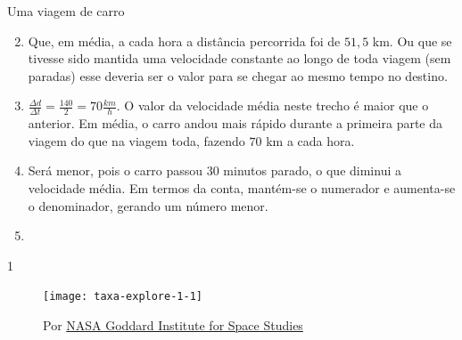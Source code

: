 \begin{answer}{Uma viagem de carro}
{
\begin{enumerate}\setcounter{enumi}{1}
\item Que, em média, a cada hora a distância percorrida foi de $51{,}5$ km. Ou que se tivesse sido mantida uma velocidade constante ao longo de toda viagem (sem paradas) esse deveria ser o valor para se chegar ao mesmo tempo no destino.

\item $\displaystyle\frac{\Delta d}{\Delta t}= \frac{140}{2}=70\frac{km}{h}$. O valor da velocidade média neste trecho é maior que o anterior. Em média, o carro andou mais rápido durante a primeira parte da viagem do que na viagem toda, fazendo $70$ km a cada hora.

\item Será menor, pois o carro passou 30 minutos parado, o que diminui a velocidade média. Em termos da conta, mantém-se o numerador e aumenta-se o denominador, gerando um número menor.

\clearpage
\item {}

\end{enumerate}
}{1}
\end{answer}

\explore{}

\begin{figure}[H]
\centering
\texttt{[image: taxa-explore-1-1]}

\caption{Por \href{http://data.giss.nasa.gov/gistemp/graphs/}{NASA Goddard Institute for Space Studies}}
\label{}
\end{figure}

